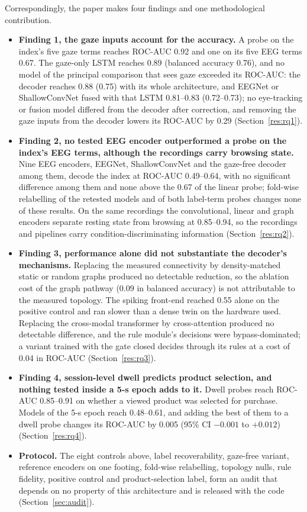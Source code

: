 Correspondingly, the paper makes four findings and one methodological contribution.
\begin{itemize}
\item \textbf{Finding 1, the gaze inputs account for the accuracy.} A probe on the index's five gaze terms reaches ROC-AUC 0.92 and one on its five EEG terms 0.67. The gaze-only LSTM reaches 0.89 (balanced accuracy 0.76), and no model of the principal comparison that sees gaze exceeded its ROC-AUC: the decoder reaches 0.88 (0.75) with its whole architecture, and EEGNet or ShallowConvNet fused with that LSTM 0.81--0.83 (0.72--0.73); no eye-tracking or fusion model differed from the decoder after correction, and removing the gaze inputs from the decoder lowers its ROC-AUC by 0.29 (Section~\ref{res:rq1}).
\item \textbf{Finding 2, no tested EEG encoder outperformed a probe on the index's EEG terms, although the recordings carry browsing state.} Nine EEG encoders, EEGNet, ShallowConvNet and the gaze-free decoder among them, decode the index at ROC-AUC 0.49--0.64, with no significant difference among them and none above the 0.67 of the linear probe; fold-wise relabelling of the retested models and of both label-term probes changes none of these results. On the same recordings the convolutional, linear and graph encoders separate resting state from browsing at 0.85--0.94, so the recordings and pipelines carry condition-discriminating information (Section~\ref{res:rq2}).
\item \textbf{Finding 3, performance alone did not substantiate the decoder's mechanisms.} Replacing the measured connectivity by density-matched static or random graphs produced no detectable reduction, so the ablation cost of the graph pathway (0.09 in balanced accuracy) is not attributable to the measured topology. The spiking front-end reached 0.55 alone on the positive control and ran slower than a dense twin on the hardware used. Replacing the cross-modal transformer by cross-attention produced no detectable difference, and the rule module's decisions were bypass-dominated; a variant trained with the gate closed decides through its rules at a cost of 0.04 in ROC-AUC (Section~\ref{res:rq3}).
\item \textbf{Finding 4, session-level dwell predicts product selection, and nothing tested inside a 5-s epoch adds to it.} Dwell probes reach ROC-AUC 0.85--0.91 on whether a viewed product was selected for purchase. Models of the 5-s epoch reach 0.48--0.61, and adding the best of them to a dwell probe changes its ROC-AUC by 0.005 (95\% CI $-0.001$ to $+0.012$) (Section~\ref{res:rq4}).
\item \textbf{Protocol.} The eight controls above, label recoverability, gaze-free variant, reference encoders on one footing, fold-wise relabelling, topology nulls, rule fidelity, positive control and product-selection label, form an audit that depends on no property of this architecture and is released with the code (Section~\ref{sec:audit}).
\end{itemize}

